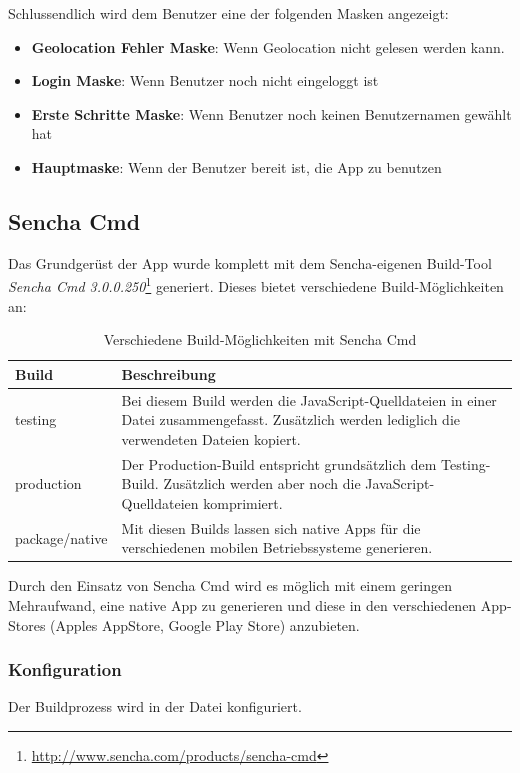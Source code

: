 Schlussendlich wird dem Benutzer eine der folgenden Masken angezeigt:

\begin{itemize}
\item \textbf{Geolocation Fehler Maske}: Wenn Geolocation nicht gelesen werden kann.
\item \textbf{Login Maske}: Wenn Benutzer noch nicht eingeloggt ist
\item \textbf{Erste Schritte Maske}: Wenn Benutzer noch keinen Benutzernamen gewählt hat
\item \textbf{Hauptmaske}: Wenn der Benutzer bereit ist, die App zu benutzen
\end{itemize}

\subsection{Sencha Cmd}
\label{sencha-cmd}
Das Grundgerüst der App wurde komplett mit dem Sencha-eigenen Build-Tool \emph{Sencha Cmd 3.0.0.250}\footnote{\url{http://www.sencha.com/products/sencha-cmd}} generiert.
Dieses bietet verschiedene Build-Möglichkeiten an:

\begin{table}[H]
\centering
\begin{tabular}{|p{0.2\twocelltabwidth}|p{0.8\twocelltabwidth}|}
\hline
\textbf{Build} & \textbf{Beschreibung} \\
\hline
testing & Bei diesem Build werden die JavaScript-Quelldateien in einer Datei zusammengefasst. Zusätzlich werden lediglich die verwendeten Dateien kopiert. \\
\hline
production & Der Production-Build entspricht grundsätzlich dem Testing-Build. Zusätzlich werden aber noch die JavaScript-Quelldateien komprimiert. \\
\hline
package/native & Mit diesen Builds lassen sich native Apps für die verschiedenen mobilen Betriebssysteme generieren. \\
\hline
\end{tabular}
\caption{Verschiedene Build-Möglichkeiten mit Sencha Cmd}
\label{table-sencha-cmd-build}
\end{table}

Durch den Einsatz von Sencha Cmd wird es möglich mit einem geringen Mehraufwand, eine native App zu generieren und diese in den verschiedenen App-Stores (Apples AppStore, Google Play Store) anzubieten.

\subsubsection{Konfiguration}
Der Buildprozess wird in der Datei  konfiguriert.

